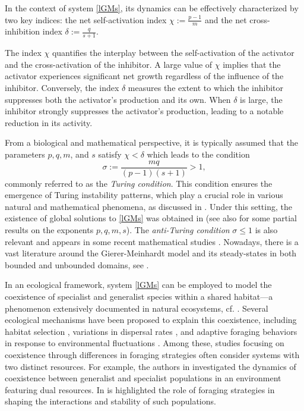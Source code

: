\documentclass[leqno,12pt]{article}
\numberwithin{equation}{section}
\begin{document}
In the context of system \eqref{lGMs}, its dynamics can be effectively characterized by two key indices: the net self-activation index $\chi := \frac{p-1}{m}$ and the net cross-inhibition index $\delta := \frac{q}{s+1}$.

The index $\chi$ quantifies the interplay between the self-activation of the activator and the cross-activation of the inhibitor. A large value of $\chi$ implies that the activator experiences significant net growth regardless of the influence of the inhibitor. Conversely, the index $\delta$ measures the extent to which the inhibitor suppresses both the activator's production and its own. When $\delta$ is large, the inhibitor strongly suppresses the activator's production, leading to a notable reduction in its activity.

From a biological and mathematical perspective, it is typically assumed that the parameters $p,q,m$, and $s$ satisfy $\chi<\delta$ which leads to the condition
\begin{equation}\label{tc}
\sigma:=\frac{mq}{(p-1)(s+1)}>1,
\end{equation}
commonly referred to as the {\it Turing condition}. This condition ensures the emergence of Turing instability patterns, which play a crucial role in various natural and mathematical phenomena, as discussed in \cite{KS17, KS18, NST06}.  Under this setting, the existence of global solutions to \eqref{lGMs} was obtained in \cite{J06} (see also \cite{MT87, R84} for some partial results on the exponents $p,q,m,s$). The {\it anti-Turing condition} $\sigma\leq 1$ is also relevant and appears in some recent mathematical studies \cite{G23,G24,KS17, KS18, KBM21}. Nowadays, there is a vast literature around the Gierer-Meinhardt model and its steady-states in both bounded and unbounded domains, see \cite{DKW03, DKZ21, DGKZ22, G09, G23, G24, GM25, KW08, KWY13, M06, M07, NST06, WW99}.

In an ecological framework, system \eqref{lGMs} can be employed to model the coexistence of specialist and generalist species within a shared habitat—a phenomenon extensively documented in natural ecosystems, cf. \cite{Buchi2014}. 
Several ecological mechanisms have been proposed to explain this coexistence, including habitat selection \cite{Morris1996_CoexistenceHabitatSelection}, variations in dispersal rates \cite{Buchi2014}, and adaptive foraging behaviors in response to environmental fluctuations \cite{WilsonYoshimura1994}. Among these, studies focusing on coexistence through differences in foraging strategies often consider systems with two distinct resources. For example, the authors in \cite{WilsonYoshimura1994} investigated the dynamics of coexistence between generalist and specialist populations in an environment featuring dual resources. In  \cite{WilsonYoshimura1994} is highlighted the role of foraging strategies in shaping the interactions and stability of such populations.
\end{document}
